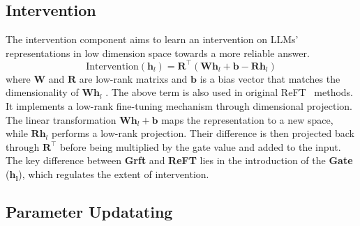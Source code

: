 
\subsection{Intervention} 
\label{Sec: Inter}
The intervention component aims to learn an intervention on LLMs' representations in low dimension space towards a more reliable answer. 
\begin{equation}
    \text{Intervention}(\mathbf{h}_l) = \mathbf{R}^\top(\mathbf{W}\mathbf{h}_l + \mathbf{b} - \mathbf{R}\mathbf{h}_l)
    \label{eq:delta}
\end{equation}
where $\mathbf{W}$ and $\mathbf{R}$ are low-rank matrixs and $\mathbf{b}$ is a bias vector that matches the dimensionality of $\mathbf{W}\mathbf{h}_l$ . The above term is also used in original ReFT~\cite{wu2024reft} methods. It
implements a low-rank fine-tuning mechanism through dimensional projection.  The linear transformation $\mathbf{W}\mathbf{h}_l + \mathbf{b}$ maps the representation to a new space, while $\mathbf{Rh}_l$ performs a low-rank projection. Their difference is then projected back through $\mathbf{R}^\top$ before being multiplied by the gate value and added to the input. The key difference between \textbf{Grft} and \textbf{ReFT} lies in the introduction of the \textbf{Gate} ($\mathbf{h_l}$), which regulates the extent of intervention.



 




\subsection{Parameter Updatating}
\label{Sec: para_up}

